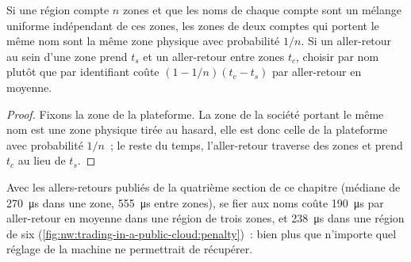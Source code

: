 \begin{proposition}\label{prop:nw:trading-in-a-public-cloud:names}
Si une région compte $n$ zones et que les noms de chaque compte sont un mélange uniforme indépendant de ces zones, les zones de deux comptes qui
portent le même nom sont la même zone physique avec probabilité $1/n$. Si un aller-retour au sein d'une zone prend $t_s$ et un aller-retour entre zones $t_c$, choisir par nom plutôt que par
identifiant coûte $(1 - 1/n)(t_c - t_s)$ par aller-retour en moyenne.
\end{proposition}

\begin{proof}
Fixons la zone de la plateforme. La zone de la société portant le même nom est une zone physique tirée au hasard, elle est donc celle de la plateforme avec probabilité $1/n$~; le
reste du temps, l'aller-retour traverse des zones et prend $t_c$ au lieu de $t_s$.
\end{proof}

\label{lst:nw:trading-in-a-public-cloud:zones}

Avec les allers-retours publiés de la quatrième section de ce chapitre (médiane de \qty{270}{\micro\second} dans une zone, \qty{555}{\micro\second} entre zones),
se fier aux noms coûte \qty{190}{\micro\second} par aller-retour en moyenne dans une région de trois zones, et \qty{238}{\micro\second} dans une région de six
(\cref{fig:nw:trading-in-a-public-cloud:penalty})~: bien plus que n'importe quel réglage de la machine ne permettrait de récupérer.

\begin{omfigure}

\label{fig:nw:trading-in-a-public-cloud:penalty}
\end{omfigure}

